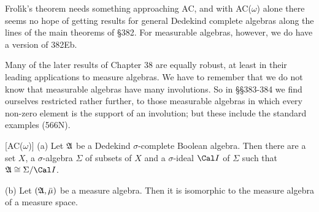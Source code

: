{Frol\'\i k's theorem needs
something approaching AC, and with AC($\omega$) alone
there seems no hope of getting results for
general Dedekind complete algebras along the lines of the main theorems of
\S382.   For measurable algebras, however, we do have a version of
382Eb.

Many of the later results of Chapter 38 are equally robust,
at least in their leading applications to measure algebras.   We
have to remember that we do not know that measurable algebras have many
involutions.   So in \S\S383-384 we find ourselves restricted rather
further, to those measurable algebras in which every
non-zero element is the support of an involution;  but these include the
standard examples (566N).
}%

 [AC($\omega$)] (a) Let $\frak A$
be a Dedekind $\sigma$-complete Boolean algebra.   Then there are a set
$X$, a $\sigma$-algebra $\Sigma$ of subsets of $X$ and a $\sigma$-ideal
$\Cal I$ of $\Sigma$ such that $\frak A\cong\Sigma/\Cal I$.

(b) Let $(\frak A,\bar\mu)$ be a measure algebra.   Then it is isomorphic
to the measure algebra of a measure space.


